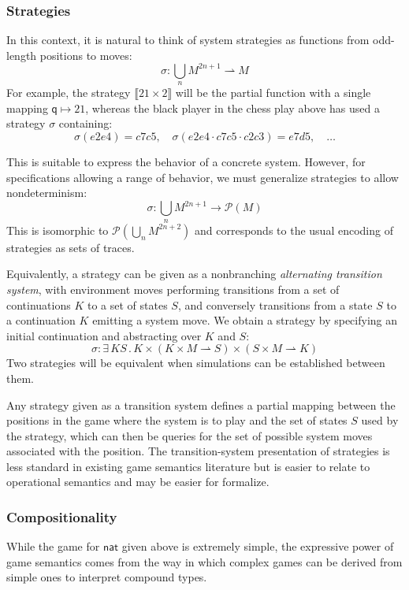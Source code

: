 \documentclass{article}
\newcommand{\kw}[1]{\ensuremath{ \mathsf{#1} }}
\begin{document}
\subsubsection{Strategies}

In this context,
it is natural to think of system strategies
as functions from odd-length positions to moves:
\[ \sigma : \bigcup_n M^{2n+1} \rightharpoonup M \]
For example,
the strategy $\llbracket 21 \times 2 \rrbracket$
will be the partial function with a single mapping $\kw{q} \mapsto 21$,
whereas the black player in the chess play above
has used a strategy $\sigma$ containing:
\[
  \sigma(e2e4) = c7c5 , \quad
  \sigma(e2e4 \cdot c7c5 \cdot c2c3) = e7d5 , \quad
  \ldots
\]

This is suitable to express the behavior of a concrete system.
However, for specifications allowing a range of behavior,
we must generalize strategies to allow nondeterminism:
\[ \sigma : \bigcup_n M^{2n+1} \rightarrow \mathcal{P}(M) \]
This is isomorphic to
$\mathcal{P}(\bigcup_n M^{2n+2})$
and corresponds to the usual encoding of strategies
as sets of traces.

Equivalently,
a strategy can be given as a
nonbranching
\emph{alternating transition system},
with environment moves performing transitions from
a set of continuations $K$ to a set of states $S$,
and conversely
transitions from a state $S$ to a continuation $K$
emitting a system move.
We obtain a strategy by
specifying an initial continuation and
abstracting over $K$ and $S$:
\[ \sigma : \exists \, K S \,.\, K \times
      (K \times M \rightharpoonup S) \times
      (S \times M \rightharpoonup K) \]
Two strategies will be equivalent
when simulations can be established between them.

Any strategy given as a transition system
defines a partial mapping between the positions in the game
where the system is to play
and the set of states $S$ used by the strategy,
which can then be queries for the set of possible
system moves associated with the position.
The transition-system presentation of strategies
is less standard in existing game semantics literature
but is easier to relate to operational semantics
and may be easier for formalize.

\subsubsection{Compositionality}

While the game for $\kw{nat}$ given above
is extremely simple,
the expressive power of game semantics
comes from the way in which complex games can be derived
from simple ones to interpret compound types.
\end{document}
